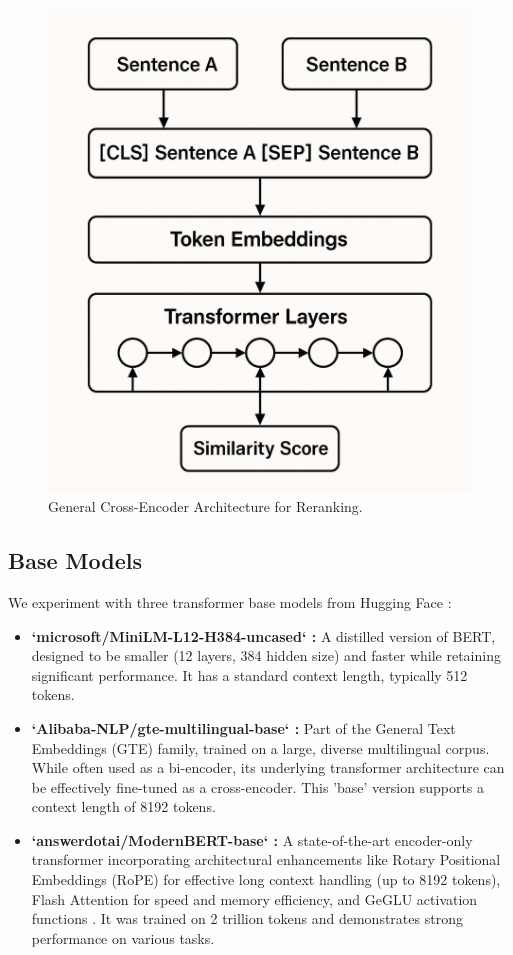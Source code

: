 \documentclass[conference]{IEEEtran}
\begin{document}
\begin{figure}[htbp]
\centering
\includegraphics[width=0.9\linewidth]{figures/cross_encoder_archi.png}
\caption{General Cross-Encoder Architecture for Reranking.}
\label{fig:cross_encoder_arch}
\end{figure}


\subsection{Base Models}
We experiment with three transformer base models from Hugging Face \cite{wolf2020transformers}:
\begin{itemize}
    \item \textbf{`microsoft/MiniLM-L12-H384-uncased` \cite{wang2020minilm}:} A distilled version of BERT, designed to be smaller (12 layers, 384 hidden size) and faster while retaining significant performance. It has a standard context length, typically 512 tokens.
    \item \textbf{`Alibaba-NLP/gte-multilingual-base` \cite{li2023towards}:} Part of the General Text Embeddings (GTE) family, trained on a large, diverse multilingual corpus. While often used as a bi-encoder, its underlying transformer architecture can be effectively fine-tuned as a cross-encoder. This 'base' version supports a context length of 8192 tokens.
    \item \textbf{`answerdotai/ModernBERT-base` \cite{modernbert}:} A state-of-the-art encoder-only transformer incorporating architectural enhancements like Rotary Positional Embeddings (RoPE) \cite{su2023roformerenhancedtransformerrotary} for effective long context handling (up to 8192 tokens), Flash Attention \cite{dao2022flashattentionfastmemoryefficientexact} for speed and memory efficiency, and GeGLU activation functions \cite{shazeer2020gluvariantsimprovetransformer}. It was trained on 2 trillion tokens and demonstrates strong performance on various tasks.
\end{itemize}
\end{document}
